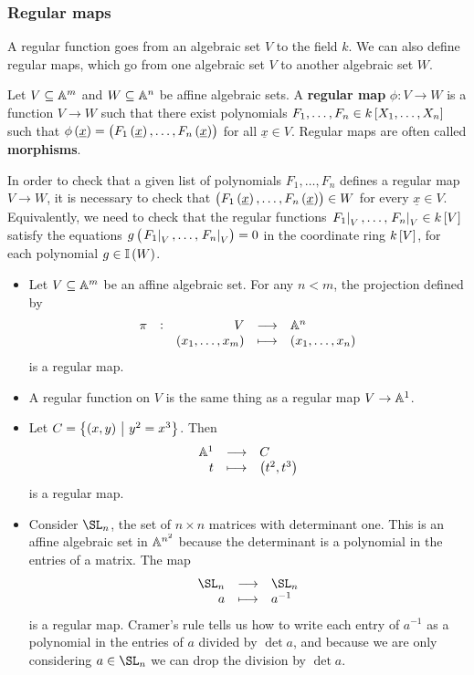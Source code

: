 \subsubsection{Regular maps}

A regular function goes from an algebraic set $ V $ to the field $ k $. We can also define regular maps, which go from one algebraic set $ V $ to another algebraic set $ W $.

\begin{definition*}
Let $ V \subseteq \AA^m $ and $ W \subseteq \AA^n $ be affine algebraic sets. A \textbf{regular map} $ \phi : V \to W $ is a function $ V \to W $ such that there exist polynomials $ F_1, \dots, F_n \in k\sbr{X_1, \dots, X_n} $ such that $ \phi\br{\underline{x}} = \br{F_1\br{\underline{x}}, \dots, F_n\br{\underline{x}}} $ for all $ \underline{x} \in V $. Regular maps are often called \textbf{morphisms}.
\end{definition*}

\begin{note*}
In order to check that a given list of polynomials $ F_1, \dots, F_n $ defines a regular map $ V \to W $, it is necessary to check that $ \br{F_1\br{\underline{x}}, \dots, F_n\br{\underline{x}}} \in W $ for every $ \underline{x} \in V $. Equivalently, we need to check that the regular functions $ \eval{F_1}_V, \dots, \eval{F_n}_V \in k\sbr{V} $ satisfy the equations $ g\br{\eval{F_1}_V, \dots, \eval{F_n}_V} = 0 $ in the coordinate ring $ k\sbr{V} $, for each polynomial $ g \in \II\br{W} $.
\end{note*}

\pagebreak

\begin{example*}
\hfill
\begin{itemize}
\item Let $ V \subseteq \AA^m $ be an affine algebraic set. For any $ n < m $, the projection defined by
$$ \function[\pi]{V}{\AA^n}{\br{x_1, \dots, x_m}}{\br{x_1, \dots, x_n}} $$
is a regular map.
\item A regular function on $ V $ is the same thing as a regular map $ V \to \AA^1 $.
\item Let $ C = \cbr{\br{x, y} \st y^2 = x^3} $. Then
$$ \function{\AA^1}{C}{t}{\br{t^2, t^3}} $$
is a regular map.
\item Consider $ \SL_n $, the set of $ n \times n $ matrices with determinant one. This is an affine algebraic set in $ \AA^{n^2} $ because the determinant is a polynomial in the entries of a matrix. The map
$$ \function{\SL_n}{\SL_n}{a}{a^{-1}} $$
is a regular map. Cramer's rule tells us how to write each entry of $ a^{-1} $ as a polynomial in the entries of $ a $ divided by $ \det a $, and because we are only considering $ a \in \SL_n $ we can drop the division by $ \det a $.
\end{itemize}
\end{example*}

